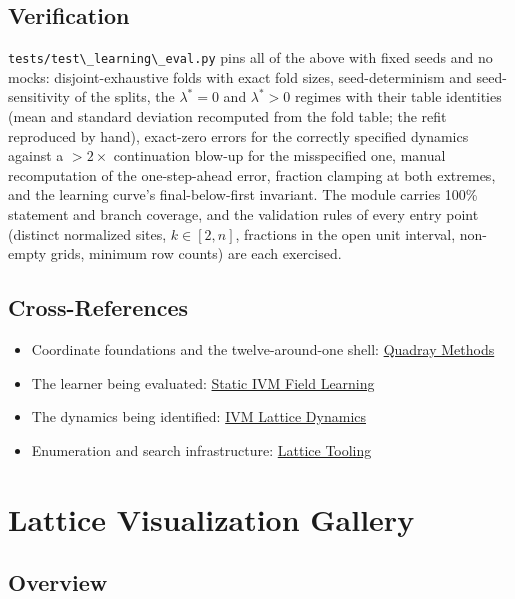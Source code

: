 \documentclass[
  10pt,
]{article}
\newcommand{\passthrough}[1]{#1}
\providecommand{\tightlist}{%
  \setlength{\itemsep}{0pt}\setlength{\parskip}{0pt}}
\begin{document}
\subsection{Verification}\label{verification-2}

\passthrough{\lstinline!tests/test\_learning\_eval.py!} pins all of the
above with fixed seeds and no mocks: disjoint-exhaustive folds with
exact fold sizes, seed-determinism and seed-sensitivity of the splits,
the \(\lambda^{*}=0\) and \(\lambda^{*}>0\) regimes with their table
identities (mean and standard deviation recomputed from the fold table;
the refit reproduced by hand), exact-zero errors for the correctly
specified dynamics against a \(> 2\times\) continuation blow-up for the
misspecified one, manual recomputation of the one-step-ahead error,
fraction clamping at both extremes, and the learning curve's
final-below-first invariant. The module carries 100\% statement and
branch coverage, and the validation rules of every entry point (distinct
normalized sites, \(k \in
[2, n]\), fractions in the open unit interval, non-empty grids, minimum
row counts) are each exercised.

\subsection{Cross-References}\label{cross-references-2}

\begin{itemize}
\tightlist
\item
  Coordinate foundations and the twelve-around-one shell:
  \href{03_quadray_methods.md}{Quadray Methods}
\item
  The learner being evaluated: \href{11_ivm_field_learning.md}{Static
  IVM Field Learning}
\item
  The dynamics being identified: \href{12_ivm_dynamics.md}{IVM Lattice
  Dynamics}
\item
  Enumeration and search infrastructure:
  \href{13_lattice_tooling.md}{Lattice Tooling}
\end{itemize}

\newpage

\section{Lattice Visualization
Gallery}\label{lattice-visualization-gallery}

\subsection{Overview}\label{overview-9}
\end{document}
